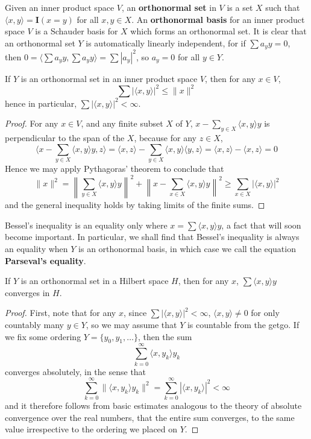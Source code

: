 Given an inner product space $V$, an {\bf orthonormal set} in $V$ is a set $X$ such that $\langle x, y \rangle = \mathbf{I}(x = y)$ for all $x,y \in X$. An {\bf orthonormal basis} for an inner product space $V$ is a Schauder basis for $X$ which forms an orthonormal set. It is clear that an orthonormal set $Y$ is automatically linearly independent, for if $\sum a_y y = 0$, then $0 = \langle \sum a_y y, \sum a_y y \rangle = \sum |a_y|^2$, so $a_y = 0$ for all $y \in Y$.

\begin{lemma}
    If $Y$ is an orthonormal set in an inner product space $V$, then for any $x \in V$,
    \[ \sum |\langle x, y \rangle|^2 \leq \| x \|^2 \]
    hence in particular, $\sum |\langle x, y \rangle|^2 < \infty$.
\end{lemma}
\begin{proof}
    For any $x \in V$, and any finite subset $X$ of $Y$, $x - \sum_{y \in X} \langle x, y \rangle y$ is perpendicular to the span of the $X$, because for any $z \in X$,
    \[ \langle x - \sum_{y \in X} \langle x, y \rangle y, z \rangle = \langle x, z \rangle - \sum_{y \in X} \langle x, y \rangle \langle y, z \rangle = \langle x, z \rangle - \langle x, z \rangle = 0 \]
    Hence we may apply Pythagoras' theorem to conclude that
    \[ \| x \|^2 = \left\| \sum_{y \in X} \langle x, y \rangle y \right\|^2 + \left\| x - \sum_{x \in X} \langle x, y \rangle y \right\|^2 \geq \sum_{x \in X} |\langle x, y\rangle|^2 \]
    and the general inequality holds by taking limits of the finite sums.
\end{proof}

Bessel's inequality is an equality only where $x = \sum \langle x, y \rangle y$, a fact that will soon become important. In particular, we shall find that Bessel's inequality is always an equality when $Y$ is an orthonormal basis, in which case we call the equation {\bf Parseval's equality}.

\begin{lemma}
    If $Y$ is an orthonormal set in a Hilbert space $H$, then for any $x$, $\sum \langle x, y \rangle y$ converges in $H$.
\end{lemma}
\begin{proof}
    First, note that for any $x$, since $\sum |\langle x, y \rangle|^2 < \infty$, $\langle x, y \rangle \neq 0$ for only countably many $y \in Y$, so we may assume that $Y$ is countable from the getgo. If we fix some ordering $Y = \{ y_0, y_1, \dots \}$, then the sum
    \[ \sum_{k = 0}^\infty \langle x, y_k \rangle y_k \]
    converges absolutely, in the sense that
    \[ \sum_{k = 0}^\infty \| \langle x, y_k \rangle y_k \|^2 = \sum_{k = 0}^\infty |\langle x, y_k \rangle|^2 < \infty \]
    and it therefore follows from basic estimates analogous to the theory of absolute convergence over the real numbers, that the entire sum converges, to the same value irrespective to the ordering we placed on $Y$.
\end{proof}

